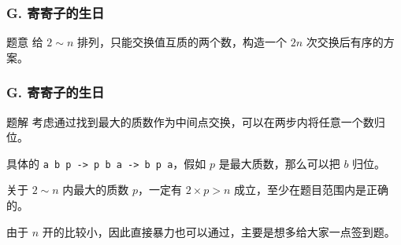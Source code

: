 \renewcommand{\problemname}{G. 寄寄子的生日}

\begin{frame}\frametitle{\problemname}

    \begin{block}{题意}
		给 $2\sim n$ 排列，只能交换值互质的两个数，构造一个 $2n$ 次交换后有序的方案。
    \end{block}

\end{frame}

\begin{frame}\frametitle{\problemname}
	
	\begin{block}{题解}
		考虑通过找到最大的质数作为中间点交换，可以在两步内将任意一个数归位。

		具体的 \texttt{a b p -> p b a -> b p a}，假如 $p$ 是最大质数，那么可以把 $b$ 归位。

		关于 $2\sim n$ 内最大的质数 $p$，一定有 $2\times p>n$ 成立，至少在题目范围内是正确的。

		由于 $n$ 开的比较小，因此直接暴力也可以通过，主要是想多给大家一点签到题。
	\end{block}
\end{frame}		

